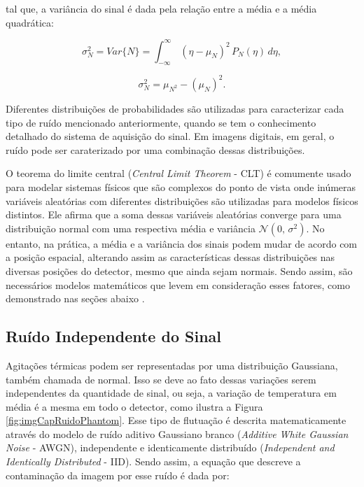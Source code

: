 \noindent tal que, a variância do sinal é dada pela relação entre a média e a média quadrática:

\begin{equation}
\sigma^{2}_{N} = Var\{N\}= {\int_{-\infty}^{\infty} \,(\eta -\mu_{N} )^{2} \, P_{N}(\eta) \, d\eta}, 
\label{eq:eqCapRuidoVariancia1}
\end{equation}

\begin{equation}
\sigma^{2}_{N}  = \mu_{N^{2}} - (\mu_{N} )^{2} .
\label{eq:eqCapRuidoVariancia2}
\end{equation}


Diferentes distribuições de probabilidades são utilizadas para caracterizar cada tipo de ruído mencionado anteriormente, quando se tem o conhecimento detalhado do sistema de aquisição do sinal. Em imagens digitais, em geral, o ruído pode ser caraterizado por uma combinação dessas distribuições.

O teorema do limite central (\textit{Central Limit Theorem} - \acs{CLT}) é comumente usado para modelar sistemas físicos que são complexos do ponto de vista onde inúmeras variáveis aleatórias com diferentes distribuições são utilizadas para modelos físicos distintos. Ele afirma que a soma dessas variáveis aleatórias converge para uma distribuição normal com uma respectiva média e variância $\mathcal{N}(0,\,\sigma^{2})$. No entanto, na prática, a média e a variância dos sinais podem mudar de acordo com a posição espacial, alterando assim as características dessas distribuições nas diversas posições do detector, mesmo que ainda sejam normais. Sendo assim, são necessários modelos matemáticos que levem em consideração esses fatores, como demonstrado nas seções abaixo \cite{bertalmiodenoising2018}.


\subsection{Ruído Independente do Sinal}

Agitações térmicas podem ser representadas por uma distribuição Gaussiana, também chamada de normal. Isso se deve ao fato dessas variações serem independentes da quantidade de sinal, ou seja, a variação de temperatura em média é a mesma em todo o detector, como ilustra a Figura \ref{fig:imgCapRuidoPhantom}. Esse tipo de flutuação é descrita matematicamente através do modelo de ruído aditivo Gaussiano branco  (\textit{Additive White Gaussian Noise} - \acs{AWGN}), independente e identicamente distribuído (\textit{Independent and Identically Distributed} - \acs{IID}). Sendo assim, a equação que descreve a contaminação da imagem por esse ruído é dada por:


